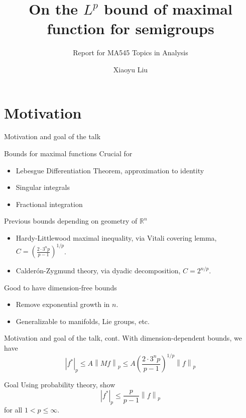 \documentclass{if-beamer}
\title[Maximal Function for Semigroup]{On the $L^p$ bound of maximal function for semigroups}
\subtitle{Report for MA545 Topics in Analysis}
\author[Liu]{Xiaoyu Liu} %
\institute[Purdue]{Purdue University \and \textbf{Instructed by Prof. Rodrigos Ba\~nuelos}}
\begin{document}
\begin{frame}
  \titlepage
\end{frame}

\section{Motivation}

\begin{frame}{Motivation and goal of the talk}

\begin{block}{Bounds for maximal functions}
    Crucial for
    \begin{itemize}
    \item Lebesgue Differentiation Theorem, approximation to identity
    \item Singular integrals
    \item Fractional integration
    \end{itemize}
    Previous bounds depending on geometry of $\mathbb{R}^n$
    \begin{itemize}
    \item Hardy-Littlewood maximal inequality, via Vitali covering lemma, $C = \left(\frac{2 \cdot 3^n p}{p- 1}\right)^{1/p}$.
    \item Calder\'on-Zygmund theory, via dyadic decomposition, $C = 2^{n/p}$.
    \end{itemize}
\end{block}

\begin{block}{Good to have dimension-free bounds}
    \begin{itemize}
        \item Remove exponential growth in $n$.
        \item Generalizable to manifolds, Lie groups, etc.
    \end{itemize}
\end{block}

\end{frame}

\begin{frame}{Motivation and goal of the talk, cont.}
    With dimension-dependent bounds, we have
    \begin{equation*}
        \left|f^*\right|_p \leq A \left\|Mf\right\|_p \leq A\left(\frac{2 \cdot 3^n p}{p- 1}\right)^{1/p} \left\|f\right\|_p
    \end{equation*}
    \begin{block}{Goal}
        Using probability theory, show
        \begin{equation*}
            \left|f^*\right|_p \leq \frac{p}{p-1} \left\|f\right\|_p
        \end{equation*}
        for all $1<p\leq \infty$.
    \end{block}
\end{frame}
\end{document}
